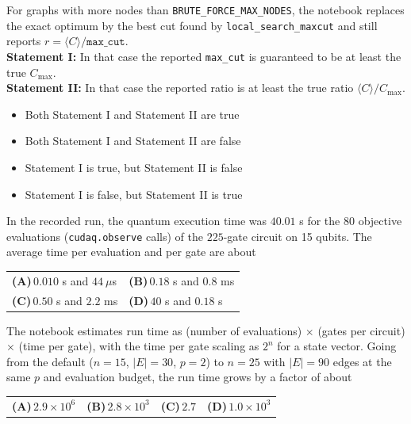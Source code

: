 \documentclass[11pt,a4paper]{article}
\newcommand{\optlabel}[1]{\textbf{(#1)}}
\newenvironment{qitem}[1]{\begin{list}{}{\setlength{\leftmargin}{3.3em}\setlength{\labelwidth}{3.1em}%
  \setlength{\labelsep}{0.2em}\setlength{\topsep}{3pt}\setlength{\parsep}{3pt}}\item[\textbf{Q.#1}\hfill]}{\end{list}}
\newcommand{\qsep}{\par\vspace{2pt}{\color{black!15}\hrule}\vspace{4pt}}
\begin{document}
\begin{qitem}{74}
For graphs with more nodes than \texttt{BRUTE\_FORCE\_MAX\_NODES}, the notebook replaces the exact optimum by the best cut found
by \texttt{local\_search\_maxcut} and still reports $r = \langle C\rangle/\texttt{max\_cut}$.\\[1mm]
\textbf{Statement I:} In that case the reported \texttt{max\_cut} is guaranteed to be at least the true $C_{\max}$.\\[1mm]
\textbf{Statement II:} In that case the reported ratio is at least the true ratio $\langle C\rangle/C_{\max}$.
\begin{itemize}[leftmargin=2.6em, labelsep=0.4em, itemsep=2pt, topsep=3pt]
\item[\optlabel{A}] Both Statement I and Statement II are true
\item[\optlabel{B}] Both Statement I and Statement II are false
\item[\optlabel{C}] Statement I is true, but Statement II is false
\item[\optlabel{D}] Statement I is false, but Statement II is true
\end{itemize}
\end{qitem}
\qsep

\begin{qitem}{75}
In the recorded run, the quantum execution time was $40.01$ s for the $80$ objective evaluations (\texttt{cudaq.observe}
calls) of the $225$-gate circuit on 15 qubits. The average time per evaluation and per gate are about
\par\smallskip\noindent\begin{tabularx}{\linewidth}{@{}*{2}{L}@{}}
\optlabel{A}\,$0.010$ s and $44\ \mu$s & \optlabel{B}\,$0.18$ s and $0.8$ ms \\[3pt]
\optlabel{C}\,$0.50$ s and $2.2$ ms & \optlabel{D}\,$40$ s and $0.18$ s
\end{tabularx}
\end{qitem}
\qsep

\begin{qitem}{76}
The notebook estimates run time as (number of evaluations) $\times$ (gates per circuit) $\times$ (time per gate), with the time per
gate scaling as $2^n$ for a state vector. Going from the default ($n = 15$, $|E| = 30$, $p = 2$) to $n = 25$ with $|E| = 90$ edges at
the same $p$ and evaluation budget, the run time grows by a factor of about
\par\smallskip\noindent\begin{tabularx}{\linewidth}{@{}*{4}{L}@{}}
\optlabel{A}\,$2.9\times10^{6}$ & \optlabel{B}\,$2.8\times10^{3}$ & \optlabel{C}\,$2.7$ & \optlabel{D}\,$1.0\times10^{3}$
\end{tabularx}
\end{qitem}
\qsep
\end{document}

